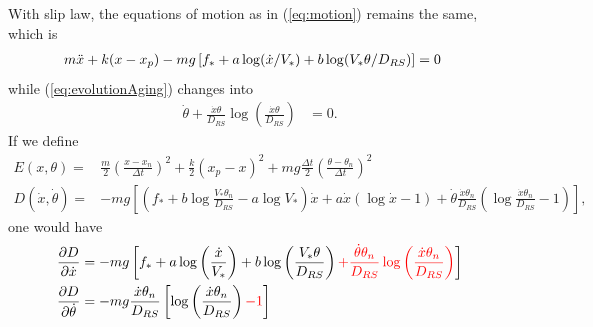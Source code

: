 With slip law, 
the equations of motion as in (\ref{eq:motion}) remains the same, 
which is 
\begin{align*}
    m\Ddot{x} + k(x - x_p) - mg\left[f_* + a\log(\dot{x}/V_*) + b \log(V_* \theta / D_{RS})\right] &= 0
\end{align*}
while (\ref{eq:evolutionAging}) changes into 
\begin{align}
    \dot{\theta} + \frac{\dot{x}\theta}{D_{RS}} \log\left(\frac{\dot{x}\theta}{D_{RS}}\right) &= 0 \label{eq:evolutionSlip}. 
\end{align}
If we define 
\begin{align}
    E(x, \theta) =& \frac{m}{2}\left(\frac{x-x_n}{\Delta t}\right)^2 + \frac{k}{2}(x_p-x)^2 + mg\frac{\Delta t}{2} \left(\frac{\theta-\theta_n}{\Delta t}\right)^2 \label{eq:ESlip}\\
    D(\dot{x}, \dot{\theta}) =& -mg\left[
    \left(f_*+b\log\frac{V_*\theta_n}{D_{RS}}-a\log V_*\right) \dot{x} 
    +a\dot{x}(\log \dot{x} - 1)
    + \dot{\theta} \frac{\dot{x}\theta_n}{D_{RS}}\left(\log \frac{\dot{x}\theta_n}{D_{RS}} - 1\right)\right] \label{eq:DSlip}, 
\end{align}
one would have 
\begin{align}
    \frac{\partial D}{\partial \dot{x}} &= -mg\left[f_* + a\log\left(\frac{\dot{x}}{V_*}\right) + b \log\left(\frac{V_* \theta}{D_{RS}}\right) \textcolor{red}{+ \frac{\dot{\theta}\theta_n}{D_{RS}}\log \left(\frac{\dot{x}\theta_n}{D_{RS}}\right)}\right]\label{eq:dDdxSlip} \\
    \frac{\partial D}{\partial \dot{\theta}} &= -mg\frac{\dot{x}\theta_n}{D_{RS}}\left[\log \left(\frac{\dot{x}\theta_n}{D_{RS}}\right)\textcolor{red}{-1}\right]
\end{align}

\newpage
